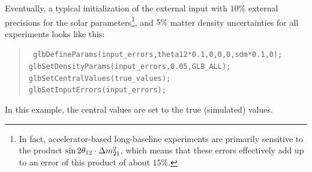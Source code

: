 Eventually, a typical initialization of the external input with
$10\%$ external precisions for the solar 
parameters\footnote{In fact, accelerator-based long-baseline experiments 
are primarily sensitive to the product $\sin 2 \theta_{12} \cdot \Delta m_{21}^2$, 
which means that these errors effectively add up to an error of this 
product of about $15\%$.}, 
and $5\%$ matter density uncertainties for all experiments looks like this:
\begin{quote}
{\tt
 glbDefineParams(input\_errors,theta12*0.1,0,0,0,sdm*0.1,0);\\  
 glbSetDensityParams(input\_errors,0.05,GLB\_ALL);\\
 glbSetCentralValues(true\_values);\\
 glbSetInputErrors(input\_errors);\\
}
\end{quote}
In this example, the central values are set to 
the true (simulated) values.


